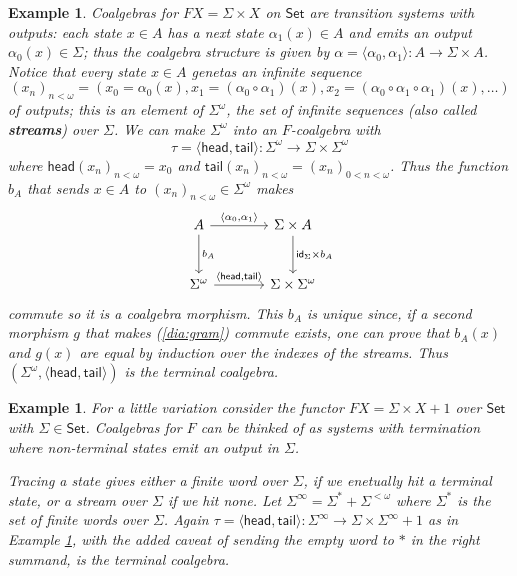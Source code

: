 \documentclass[letterpaper, 11pt, oneside]{memoir}
\theoremstyle{myteo}
\newtheorem{example}[theorem]{Example}
\numberwithin{equation}{section}
\newcommand{\marginnote}[1]{\marginpar{\footnotesize #1}}
\newcommand{\id}{\textsf{id}}
\newcommand{\head}{\textsf{head}}
\newcommand{\tail}{\textsf{tail}}
\newcommand{\Set}{\textsf{Set}}
\newcommand{\intoprod}[2]{{\langle #1, #2\rangle}}
\begin{document}
\begin{example}
  \label{ex:transition_systems_with_outputs}
  Coalgebras for \(FX = \Sigma \times X\) on \(\Set\) are transition systems with outputs: each state \(x \in A\) has a next state \(\alpha_1(x) \in A\) and emits an output \(\alpha_0(x) \in \Sigma\); thus the coalgebra structure is given by \(\alpha = \intoprod{\alpha_0}{\alpha_1} : A \to \Sigma \times A\).
  Notice that every state \(x \in A\) genetas an infinite sequence
  \begin{equation*}
    (x_n)_{n < \omega} = (x_0 = \alpha_0(x), x_1 = (\alpha_0 \circ \alpha_1)(x), x_2 = (\alpha_0 \circ \alpha_1 \circ \alpha_1)(x), \ldots)
  \end{equation*}
  of outputs; this is an element of \(\Sigma^\omega\), the set of infinite sequences (also called \textbf{streams}\marginnote{\(\Sigma\)-streams}) over \(\Sigma\).
  We can make \(\Sigma^\omega\) into an \(F\)-coalgebra with
  \begin{equation*}
    \tau = \intoprod{\head}{\tail} : \Sigma^\omega \to \Sigma \times \Sigma^\omega
  \end{equation*}
  where \(\head(x_n)_{n < \omega} = x_0\) and \(\tail(x_n)_{n < \omega} = (x_n)_{0 < n < \omega}\).
  Thus the function \(b_A\) that sends \(x \in A\) to \((x_n)_{n < \omega} \in \Sigma^\omega\) makes
  \begin{equation}
    \label{dia:gram}
    \begin{tikzcd}[sep=large]
      A \ar[r, "\intoprod{\alpha_0}{\alpha_1}"] \ar[d, "b_A"] & \Sigma \times A  \ar[d, "\id_\Sigma \times b_A"] \\
      \Sigma^\omega \ar[r, "\intoprod{\head}{\tail}"] & \Sigma \times \Sigma^\omega
    \end{tikzcd}
  \end{equation}
  commute so it is a coalgebra morphism.
  This \(b_A\) is unique since, if a second morphism \(g\) that makes (\ref{dia:gram}) commute exists, one can prove that \(b_A(x)\) and \(g(x)\) are equal by induction over the indexes of the streams.
  Thus \((\Sigma^\omega, \intoprod{\head}{\tail})\) is the terminal coalgebra.
\end{example}

\begin{example}
  For a little variation consider the functor \(FX = \Sigma \times X + 1\) over \(\Set\) with \(\Sigma \in \Set\).
  Coalgebras for \(F\) can be thinked of as systems with termination where non-terminal states emit an output in \(\Sigma\).

  Tracing a state gives either a finite word over \(\Sigma\), if we enetually hit a terminal state, or a stream over \(\Sigma\) if we hit none.
  Let \(\Sigma^\infty = \Sigma^* + \Sigma^{<\omega}\) where \(\Sigma^*\) is the set of finite words over \(\Sigma\).
  Again \(\tau = \intoprod{\head}{\tail} : \Sigma^\infty \to \Sigma \times \Sigma^\infty + 1\) as in Example \ref{ex:transition_systems_with_outputs}, with the added caveat of sending the empty word to \(*\) in the right summand, is the terminal coalgebra.
\end{example}
\end{document}
